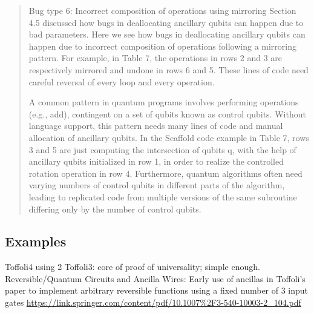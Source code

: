 \documentclass[sigplan,10pt,review,anonymous]{acmart}
\begin{document}
\begin{quote}

  Bug type 6: Incorrect composition of operations using mirroring Section 4.5 discussed how bugs in deallocating ancillary qubits can happen due to bad parameters. Here we see how bugs in deallocating ancillary qubits can happen due to incorrect composition of operations following a mirroring pattern. For example, in Table 7, the operations in rows 2 and 3 are respectively mirrored and undone in rows 6 and 5. These lines of code need careful reversal of every loop and every operation.

  A common pattern in quantum programs involves performing operations (e.g., add), contingent on a set of qubits known as control qubits. Without language support, this pattern needs many lines of code and manual allocation of ancillary qubits. In the Scaffold code example in Table 7, rows 3 and 5 are just computing the intersection of qubits q, with the help of ancillary qubits initialized in row 1, in order to realize the controlled rotation operation in row 4. Furthermore, quantum algorithms often need varying numbers of control qubits in different parts of the algorithm, leading to replicated code from multiple versions of the same subroutine differing only by the number of control qubits.

\end{quote}

\subsection{Examples}
 
Toffoli4 using 2 Toffoli3: core of proof of universality; simple
enough. Reversible/Quantum Circuits and Ancilla Wires: Early use of
ancillas in Toffoli's paper to implement arbitrary reversible
functions using a fixed number of 3 input gates
\url{https://link.springer.com/content/pdf/10.1007%2F3-540-10003-2_104.pdf}
\end{document}
